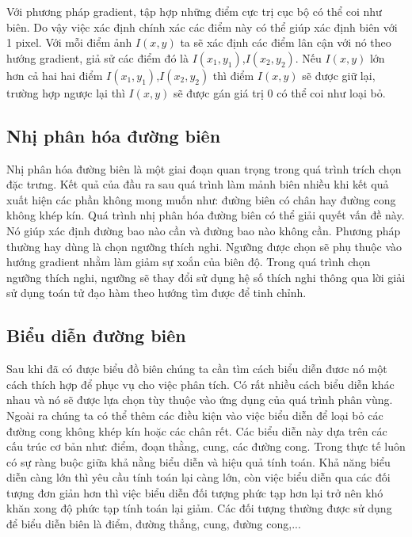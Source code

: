 \documentclass[14pt,oneside,a4paper]{extreport}
\begin{document}
Với phương pháp gradient, tập hợp những điểm cực trị cục bộ có thể coi như biên. Do vậy việc xác định chính xác các điểm này có thể giúp xác định biên với 1 pixel. Với mỗi điểm ảnh $I(x,y)$ ta sẽ xác định các điểm lân cận với  nó theo hướng gradient, giả sử các điểm đó là $I(x_1,y_1)$,$I(x_2,y_2)$. Nếu $I(x,y)$ lớn hơn cả hai hai điểm $I(x_1,y_1)$,$I(x_2,y_2)$  thì điểm $I(x,y)$ sẽ được giữ lại, trường hợp ngược lại thì $I(x,y)$ sẽ được gán giá trị 0 có thể coi như loại bỏ. 
\subsection{Nhị phân hóa đường biên}
Nhị phân hóa đường biên là một giai đoạn quan trọng trong quá trình trích chọn đặc trưng. Kết quả của đầu ra sau quá trình làm mảnh biên nhiều khi kết quả xuất hiện các phần không mong muốn như: đường biên có chân hay đường cong không khép kín. Quá trình nhị phân hóa đường biên có thể giải quyết vấn đề này. Nó giúp xác định đường bao nào cần và đường bao nào không cần. Phương pháp thường hay dùng là chọn ngưỡng thích nghi. Ngưỡng được chọn sẽ phụ thuộc vào  hướng gradient nhằm làm giảm sự xoắn của biên độ. Trong quá trình chọn ngưỡng thích nghi, ngưỡng sẽ thay đổi sử dụng   hệ số thích nghi thông qua lời giải sử dụng toán tử đạo hàm theo hướng tìm được để tinh chỉnh. 
\subsection{Biểu diễn đường biên}
Sau khi đã có được biểu đồ biên chúng ta cần tìm cách biểu diễn đươc nó một cách thích hợp để phục vụ cho việc phân tích. Có rất nhiều cách biểu diễn khác nhau và nó sẽ được lựa chọn  tùy thuộc vào ứng dụng của quá trình phân vùng. Ngoài ra chúng ta có thể thêm các điều kiện vào việc biểu diễn để loại bỏ các đường cong không khép kín hoặc các chân rết.  Các biểu diễn này dựa trên các cấu trúc cơ bản như: điểm, đoạn thằng, cung, các đường cong. Trong thực tế luôn có sự ràng buộc giữa khả nằng biểu diễn và hiệu quả tính toán. Khả năng biểu diễn càng lớn thì yêu cầu tính toán lại càng lớn, còn việc biểu diễn qua các đối tượng đơn giản hơn thì việc biểu diễn đối tượng phức tạp hơn lại trở nên khó khăn xong độ phức tạp tính toán lại giảm. Các đối tượng thường được sử dụng để biểu diễn biên là điểm, đường thẳng, cung, đường cong,...
\end{document}
